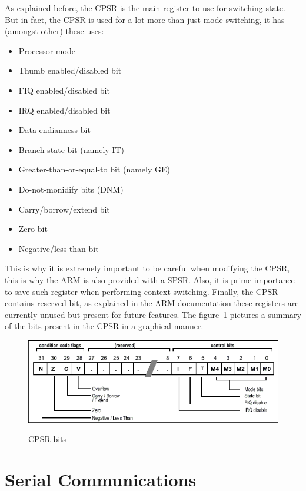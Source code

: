 As explained before, the CPSR is the main register to use for switching state. But in fact, the CPSR is used for a lot more than just mode switching, it has (amongst other) these uses: 

\begin{itemize}
\item Processor mode
\item Thumb enabled/disabled bit
\item FIQ enabled/disabled bit
\item IRQ enabled/disabled bit
\item Data endianness bit
\item Branch state bit (namely IT)
\item Greater-than-or-equal-to bit (namely GE)
\item Do-not-monidify bits (DNM)
\item Carry/borrow/extend bit
\item Zero bit
\item Negative/less than bit
\end{itemize}

This is why it is extremely important to be careful when modifying the CPSR, this is why the ARM is also provided with a SPSR. Also, it is prime importance to save such register when performing context switching. Finally, the CPSR contains reserved bit, as explained in the ARM documentation these registers are currently unused but present for future features. The figure~\ref{fig:chapter2_cpsr} pictures a summary of the bits present in the CPSR in a graphical manner.

\begin{figure}[H]
\begin{center}
\includegraphics[width=1\textwidth]{includes/figures/chapter2_cpsr.png}  \\[0.5 cm]
\end{center}
\caption{CPSR bits}
\label{fig:chapter2_cpsr}
\end{figure}


\section{Serial Communications}\label{chapter2_serial_communications}

